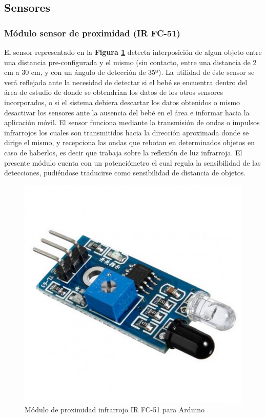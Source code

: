 \documentclass{IEEEtran}
\begin{document}
		\subsection{Sensores}

			\subsubsection{Módulo sensor de proximidad (\textbf{IR FC-51})}

			El sensor representado en la \textbf{Figura \ref{arduino-modulo-proximidad}} detecta interposición de algun objeto entre una distancia pre-configurada y el mismo (sin contacto, entre una distancia de 2 cm a 30 cm, y con un ángulo de detección de 35º). La utilidad de éste sensor se verá reflejada ante la necesidad de detectar si el bebé se encuentra dentro del área de estudio de donde se obtendrían los datos de los otros sensores incorporados, o si el sistema debiera descartar los datos obtenidos o mismo desactivar los sensores ante la ausencia del bebé en el área e informar hacia la aplicación móvil. El sensor funciona mediante la transmisión de ondas o impulsos infrarrojos los cuales son transmitidos hacia la dirección aproximada donde se dirige el mismo, y recepciona las ondas que rebotan en determinados objetos en caso de haberlos, es decir que trabaja sobre la reflexión de luz infrarroja. El presente módulo cuenta con un potenciómetro el cual regula la sensibilidad de las detecciones, pudiéndose traducirse como sensibilidad de distancia de objetos. 

				\begin{figure}
					\centering
					\includegraphics[width=0.6\linewidth]{arduino-modulo-proximidad}
					\caption{Módulo de proximidad infrarrojo IR FC-51 para Arduino}
					\label{arduino-modulo-proximidad}
				\end{figure}
\end{document}
